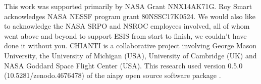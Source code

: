 	

\begin{acknowledgements}
	This work was supported primarily by NASA Grant NNX14AK71G.
	Roy Smart acknowledges NASA NESSF program grant 80NSSC17K0524.
	We would also like to acknowledge the NASA SRPO and NSROC employees involved, all of whom went above and beyond to support ESIS from start to finish, we couldn't have done it without you. 
	CHIANTI is a collaborative project involving George Mason University, the University of Michigan (USA), University of Cambridge (UK) and NASA Goddard Space Flight Center (USA).
	This research used version 0.5.0 (10.5281/zenodo.4676478) of the aiapy open source software package \citep{aiapy}.
	
	
\end{acknowledgements}



\appendix

